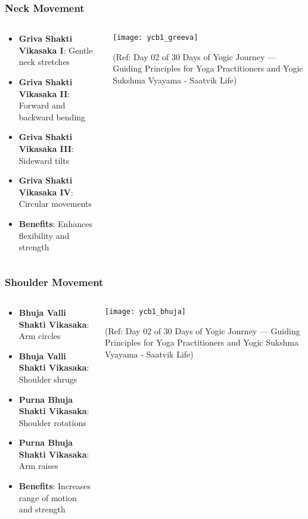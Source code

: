 \begin{frame}[fragile]\frametitle{Neck Movement}
\begin{columns}
    \begin{column}[T]{0.5\linewidth}
      \begin{itemize}
		\item \textbf{Griva Shakti Vikasaka I}: Gentle neck stretches
		\item \textbf{Griva Shakti Vikasaka II}: Forward and backward bending
		\item \textbf{Griva Shakti Vikasaka III}: Sideward tilts
		\item \textbf{Griva Shakti Vikasaka IV}: Circular movements
		\item \textbf{Benefits}: Enhances flexibility and strength
	  \end{itemize}
    \end{column}
    \begin{column}[T]{0.5\linewidth}
		\begin{center}
		        \texttt{[image: ycb1\_greeva]}
				
				{\tiny (Ref: Day 02 of 30 Days of Yogic Journey — Guiding Principles for Yoga Practitioners and Yogic Sukshma Vyayama - Saatvik Life)}		
		\end{center}	
    \end{column}
\end{columns}
\end{frame}

\begin{frame}[fragile]\frametitle{Shoulder Movement}
\begin{columns}
    \begin{column}[T]{0.5\linewidth}
      \begin{itemize}
		\item \textbf{Bhuja Valli Shakti Vikasaka}: Arm circles
		\item \textbf{Bhuja Valli Shakti Vikasaka}: Shoulder shrugs
		\item \textbf{Purna Bhuja Shakti Vikasaka}: Shoulder rotations
		\item \textbf{Purna Bhuja Shakti Vikasaka}: Arm raises
		\item \textbf{Benefits}: Increases range of motion and strength
	  \end{itemize}
    \end{column}
    \begin{column}[T]{0.5\linewidth}
		\begin{center}
		        \texttt{[image: ycb1\_bhuja]}
				
				{\tiny (Ref: Day 02 of 30 Days of Yogic Journey — Guiding Principles for Yoga Practitioners and Yogic Sukshma Vyayama - Saatvik Life)}		
		\end{center}	
    \end{column}
\end{columns}
\end{frame}

